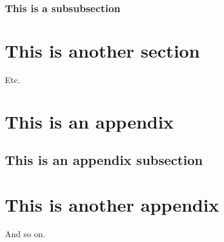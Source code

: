 \documentclass[12pt]{article}
\begin{document}
  \subsubsection{This is a subsubsection}

  \clearpage
  \section{This is another section}
  Etc.

  \cleardoublepage
  \phantom{text}
  \begin{appendices}
    \clearpage
    \section{This is an appendix}
    
    \subsection{This is an appendix subsection}

    \clearpage
    \section{This is another appendix}
    And so on.
  \end{appendices}

  \clearpage
  
  
\end{document}
